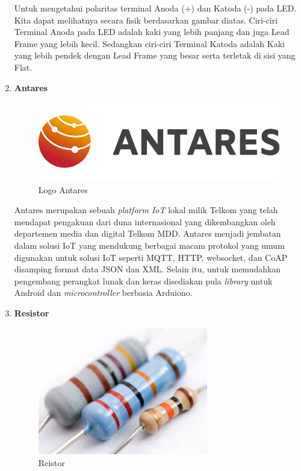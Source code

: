 \begin{enumerate}
\par Untuk mengetahui polaritas terminal Anoda (+) dan Katoda (-) pada LED. Kita dapat melihatnya secara fisik berdasarkan gambar diatas. Ciri-ciri Terminal Anoda pada LED adalah kaki yang lebih panjang dan juga Lead Frame yang lebih kecil. Sedangkan ciri-ciri Terminal Katoda adalah Kaki yang lebih pendek dengan Lead Frame yang besar serta terletak di sisi yang Flat.


\item \textbf{Antares}
\begin{figure}[H]
\centering
\includegraphics[width=1\textwidth]{figures/antares.png}
\caption{Logo Antares}
\label{print}
\end{figure}

\par Antares merupakan sebuah \textit{platform IoT} lokal milik Telkom yang telah mendapat pengakuan dari duna internasional yang dikembangkan oleh departemen media dan digital Telkom MDD. Antares menjadi jembatan dalam solusi IoT yang mendukung berbagai macam protokol yang umum digunakan untuk solusi IoT seperti MQTT, HTTP, websocket, dan CoAP disamping format data JSON dan XML. Selain itu, untuk memudahkan pengembang perangkat lunak dan keras disediakan pula \textit{library} untuk Android dan \textit{microcontroller} berbasia Arduiono.

\item \textbf{Resistor}
\begin{figure}[H]
\centering
\includegraphics[width=0.7\textwidth]{figures/resistor3.jpg}
\caption{Reistor}
\label{print}
\end{figure}


\end{enumerate}
